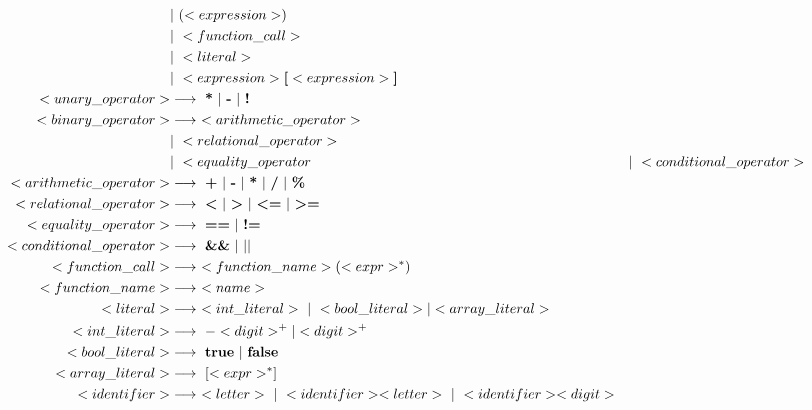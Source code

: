 \documentclass{article}
\begin{document}
\begin{align*}
    &| \ ( <expression> ) \\
    &| \ <function\_call> \\
    &| \ <literal> \\
    &| \ <expression> \textbf{[} <expression> \textbf{]} \\
<unary\_operator> &\longrightarrow \ \textbf{*} \ | \ \textbf{-} \ | \ \textbf{!} \\
<binary\_operator> &\longrightarrow \ <arithmetic\_operator> \\ 
    &| \ <relational\_operator> \\
    &| \ <equality\_operator
    &| \ <conditional\_operator> \\
<arithmetic\_operator> &\longrightarrow \ \textbf{+} \
    | \ \textbf{-} \
    | \ \textbf{*} \
    | \ \textbf{/} \
    | \ \textbf{\%} \\
<relational\_operator> &\longrightarrow \ \textbf{\textless} \
    | \ \textbf{\textgreater} \
    | \ \textbf{\textless=} \
    | \ \textbf{\textgreater=} \\
<equality\_operator> &\longrightarrow \ \textbf{==} \ | \ \textbf{!=} \\
<conditional\_operator> &\longrightarrow \ \textbf{\&\&} \ | \ \textbf{$\mid\mid$} \\
<function\_call> &\longrightarrow \ <function\_name> ( <expr>^* ) \\
<function\_name> &\longrightarrow \ <name> \\
<literal> &\longrightarrow \ <int\_literal> \ | \ <bool\_literal> | <array\_literal> \\
<int\_literal> &\longrightarrow \ - <digit>^+|<digit>^+ \\
<bool\_literal> &\longrightarrow \ \textbf{true} \ | \ \textbf{false} \\
<array\_literal> &\longrightarrow \ [<expr>^*] \\
<identifier> &\longrightarrow \ <letter> \ | \ <identifier> <letter> \ | \ <identifier><digit> \\
\end{align*}
\end{document}
